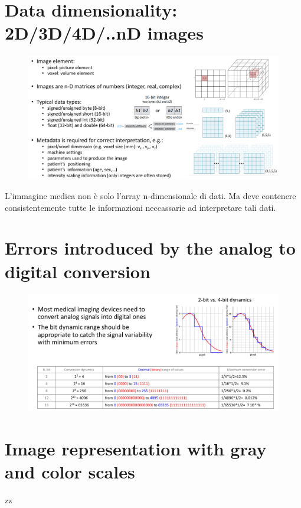 \section{Data dimensionality: 2D/3D/4D/..nD images}

\begin{figure}[ht]
	\centering
	\includegraphics[width=1\linewidth]{figure_med/datadim}

\end{figure}
\FloatBarrier


L'immagine medica non è solo l'array n-dimensionale di dati. Ma deve contenere consistentemente tutte le informazioni neccassarie ad interpretare tali dati.

\section{Errors introduced by the analog to digital conversion}

\begin{figure}[ht]
	\centering
	\includegraphics[width=0.8\linewidth]{figure_med/adc}
	
\end{figure}
\FloatBarrier


\section{Image representation with gray and color scales}
zz

